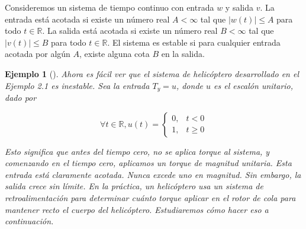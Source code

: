 \documentclass[12pt,a4paper]{article}
\newtheorem{example}{Ejemplo}[section]
\begin{document}
Consideremos un sistema de tiempo continuo con entrada $w$ y salida $v$. La entrada está acotada si existe un número real $A < \infty$ tal que $|w(t)| \leq A$ para todo $t \in \mathbb{R}$. La salida está acotada si existe un número real $B < \infty$ tal que $|v(t)| \leq B$ para todo $t \in \mathbb{R}$. El sistema es estable si para cualquier entrada acotada por algún $A$, existe alguna cota $B$ en la salida.

\begin{example}[]
Ahora es fácil ver que el sistema de helicóptero desarrollado en el Ejemplo 2.1 es inestable. Sea la entrada $T_y = u$, donde $u$ es el escalón unitario, dado por

\[
\forall t \in \mathbb{R}, u(t) =
\begin{cases}
0, & t < 0 \\
1, & t \geq 0
\end{cases} \tag{2.8}
\]

Esto significa que antes del tiempo cero, no se aplica torque al sistema, y comenzando en el tiempo cero, aplicamos un torque de magnitud unitaria. Esta entrada está claramente acotada. Nunca excede uno en magnitud. Sin embargo, la salida crece sin límite. En la práctica, un helicóptero usa un sistema de retroalimentación para determinar cuánto torque aplicar en el rotor de cola para mantener recto el cuerpo del helicóptero. Estudiaremos cómo hacer eso a continuación.
\end{example}
\end{document}
